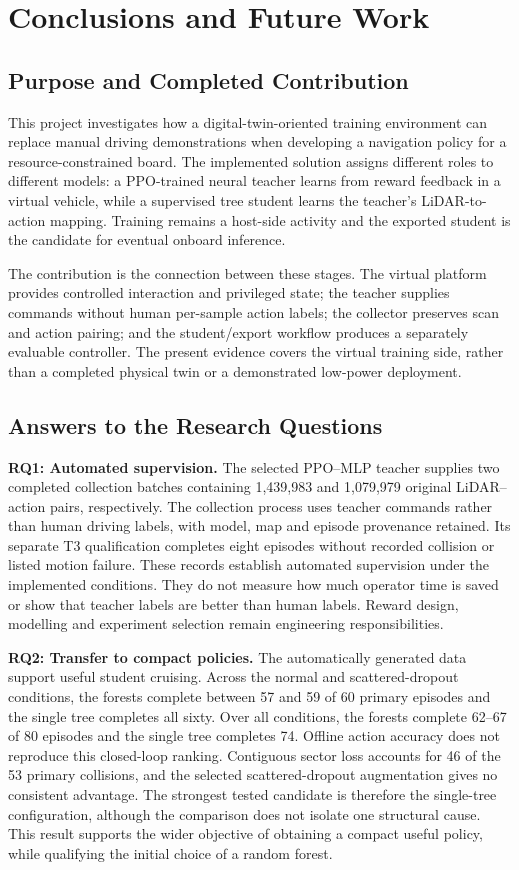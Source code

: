 \chapter{Conclusions and Future Work}
\label{ch:conclusions}
\section{Purpose and Completed Contribution}
This project investigates how a digital-twin-oriented training environment can
replace manual driving demonstrations when developing a navigation policy for
a resource-constrained board. The implemented solution assigns different roles
to different models: a PPO-trained neural teacher learns from reward feedback
in a virtual vehicle, while a supervised tree student learns the teacher's
LiDAR-to-action mapping. Training remains a host-side activity and the exported
student is the candidate for eventual onboard inference.

The contribution is the connection between these stages. The virtual platform
provides controlled interaction and privileged state; the teacher supplies
commands without human per-sample action labels; the collector preserves scan
and action pairing; and the student/export workflow produces a separately
evaluable controller. The present evidence covers the virtual training side,
rather than a completed physical twin or a demonstrated low-power deployment.

\section{Answers to the Research Questions}
\textbf{RQ1: Automated supervision.}
The selected PPO--MLP teacher supplies two completed collection batches containing
1,439,983 and 1,079,979 original LiDAR--action pairs, respectively. The collection
process uses teacher commands rather than human driving labels, with model,
map and episode provenance retained. Its separate T3 qualification completes
eight episodes without recorded collision or listed motion failure. These
records establish automated supervision under the implemented conditions.
They do not measure how much operator time is saved or show that teacher labels
are better than human labels. Reward design, modelling and experiment selection
remain engineering responsibilities.

\textbf{RQ2: Transfer to compact policies.}
The automatically generated data support useful student cruising. Across the
normal and scattered-dropout conditions, the forests complete between 57 and
59 of 60 primary episodes and the single tree completes all sixty. Over all
conditions, the forests complete 62--67 of 80 episodes and the single tree
completes 74. Offline action accuracy does not reproduce this closed-loop
ranking. Contiguous sector loss accounts for 46 of the 53 primary collisions,
and the selected scattered-dropout augmentation gives no consistent advantage.
The strongest tested candidate is therefore the single-tree configuration,
although the comparison does not isolate one structural cause. This result
supports the wider objective of obtaining a compact useful policy, while
qualifying the initial choice of a random forest.


